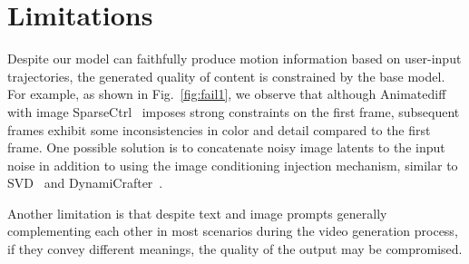 \documentclass{article} %
\begin{document}
\section{Limitations}
Despite our model can faithfully produce motion information based on user-input trajectories, the generated quality of content is constrained by the base model. For example, as shown in Fig.~\ref{fig:fail1}, we observe that although Animatediff~\citep{guo2023animatediff} with image SparseCtrl~\citep{guo2023sparsectrl} imposes strong constraints on the first frame, subsequent frames exhibit some inconsistencies in color and detail compared to the first frame. One possible solution is to concatenate noisy image latents to the input noise in addition to using the image conditioning injection mechanism, similar to SVD~\citep{blattmann2023stable} and DynamiCrafter~\citep{xing2023dynamicrafter}. 

Another limitation is that despite text and image prompts generally complementing each other in most scenarios during the video generation process, if they convey different meanings, the quality of the output may be compromised.
\end{document}
